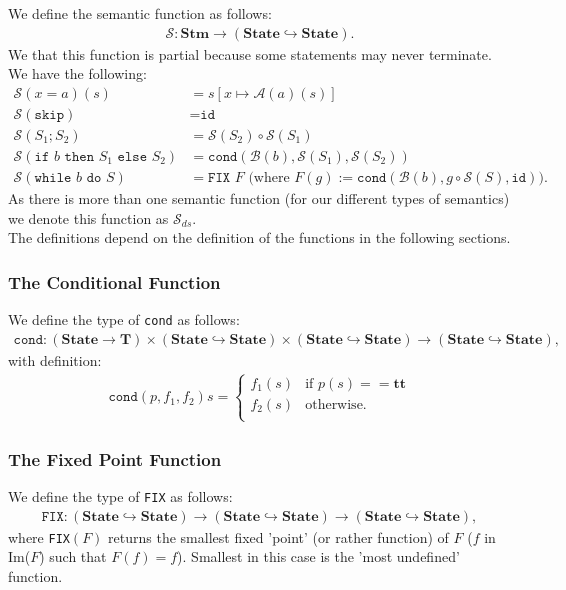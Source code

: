 \documentclass[a4paper, 12pt, twoside]{article}
\begin{document}
We define the semantic function as follows: \begin{gather*}
  \mathcal{S}: \textbf{Stm} \to (\textbf{State} \hookrightarrow \textbf{State}).
\end{gather*} We that this function is partial because some statements
may never terminate. We have the following: \begin{align*}
  \mathcal{S}(x = a)(s) &= s[x \mapsto \mathcal{A}(a)(s)] \\
  \mathcal{S}(\texttt{skip}) &= \texttt{id} \\
  \mathcal{S}(S_1 ; S_2) &= \mathcal{S}(S_2) \circ \mathcal{S}(S_1) \\
  \mathcal{S}(\texttt{if } b \texttt{ then } S_1 \texttt{ else } S_2)
  &= \texttt{cond}(\mathcal{B}(b), \mathcal{S}(S_1), \mathcal{S}(S_2)) \\
  \mathcal{S}(\texttt{while } b \texttt{ do } S)
  &= \texttt{FIX } F \text{ (where } F(g) 
  := \texttt{cond}(\mathcal{B}(b), g \circ \mathcal{S}(S), \texttt{id})).
\end{align*} 
As there is more than one semantic function (for our different types
of semantics) we denote this function as $\mathcal{S}_{ds}$.
\\[\baselineskip]
The definitions depend on the definition of the functions in the 
following sections.

\subsubsection{The Conditional Function}

We define the type of \texttt{cond} as follows: \begin{gather*}
  \texttt{cond} : 
  (\textbf{State} \to \textbf{T}) \times
  (\textbf{State} \hookrightarrow \textbf{State}) \times
  (\textbf{State} \hookrightarrow \textbf{State}) \to
  (\textbf{State} \hookrightarrow \textbf{State}),
\end{gather*} with definition: \begin{gather*}
  \texttt{cond}(p, f_1, f_2)s = \begin{cases}
    f_1(s) & \text{if } p(s) == \textbf{tt} \\
    f_2(s) & \text{otherwise.} \\
  \end{cases}
\end{gather*}

\subsubsection{The Fixed Point Function}

We define the type of \texttt{FIX} as follows: \begin{gather*}
  \texttt{FIX} : 
  (\textbf{State} \hookrightarrow \textbf{State}) \to
  (\textbf{State} \hookrightarrow \textbf{State}) \to
  (\textbf{State} \hookrightarrow \textbf{State}),
\end{gather*} where \texttt{FIX}$(F)$ returns the smallest fixed 'point'
(or rather function) of $F$ ($f$ in Im($F$) such that $F(f) = f$). 
Smallest in this case is the 'most undefined' function.
\end{document}
